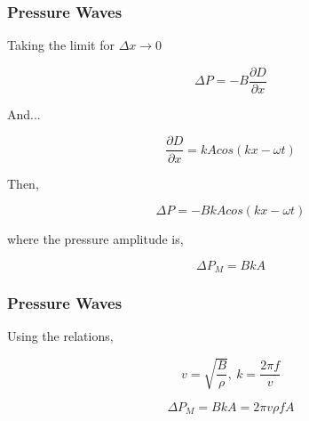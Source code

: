 \documentclass[]{beamer}
\begin{document}
\begin{frame}
\frametitle{Pressure Waves}
Taking the limit for $\Delta x\rightarrow 0$

\begin{equation}
\Delta P=-B\frac{\partial  D}{\partial x}
\end{equation}

And...

\begin{equation}
\frac{\partial  D}{\partial x}=kA cos(kx-\omega t)
\end{equation}

Then,

\begin{equation}
\Delta P=-BkA cos(kx-\omega t)
\end{equation}

where the pressure amplitude is,


\begin{equation}
\Delta P_M=BkA 
\end{equation}

  \end{frame}




\begin{frame}
\frametitle{Pressure Waves}
Using the relations,


\begin{equation*}
v=\sqrt{\frac{B}{\rho}}, \ k=\frac{2\pi f}{v}
\end{equation*}

\begin{equation}
\Delta P_M=BkA =2\pi v \rho f A
\end{equation}

  \end{frame}
\end{document}
